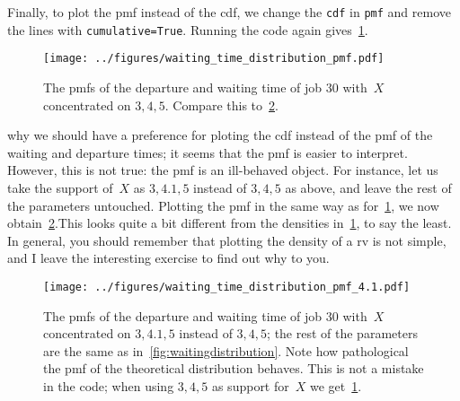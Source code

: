 \documentclass[stochastic-or.tex]{subfiles}
\begin{document}
Finally, to plot the pmf instead of the cdf, we change the \texttt{cdf} in \texttt{pmf} and remove the lines with \texttt{cumulative=True}. Running the code again gives~\cref{fig:waitingdistributionpmfgood}.

\begin{figure}[tb]
\centering
\texttt{[image: ../figures/waiting\_time\_distribution\_pmf.pdf]}
\caption{The pmfs of the departure and waiting time of job $30$ with~$X$  concentrated on $3, 4, 5$. Compare this to~\cref{fig:waitingdistributionpmf}.}
\label{fig:waitingdistributionpmfgood}
\end{figure}


 why we should have a preference for ploting the cdf instead of the pmf of the waiting and departure times; it seems that the pmf is easier to interpret.
However, this is not true: the pmf is an ill-behaved object.
For instance, let us take the support of~$X$ as $3, 4.1, 5$ instead of $3, 4, 5$ as above, and leave the rest of the parameters untouched.
Plotting the pmf in the same way as for~\cref{fig:waitingdistributionpmfgood}, we now obtain~\cref{fig:waitingdistributionpmf}.This looks quite a bit different from the densities in~\cref{fig:waitingdistributionpmfgood}, to say the least.
In general, you should remember that plotting the density of a rv is not simple, and I leave the  interesting exercise to find out why to you.

\begin{figure}[tb]
\centering
\texttt{[image: ../figures/waiting\_time\_distribution\_pmf\_4.1.pdf]}
\caption{The pmfs of the departure and waiting time of job $30$ with~$X$ concentrated on $3, 4.1, 5$ instead of $3, 4, 5$; the rest of the parameters are the same as in~\cref{fig:waitingdistribution}.
Note how pathological the pmf of the theoretical distribution behaves.
This is not a mistake in the code; when using $3, 4, 5$ as support for~$X$ we get~\cref{fig:waitingdistributionpmfgood}.
}
\label{fig:waitingdistributionpmf}
\end{figure}
\end{document}
